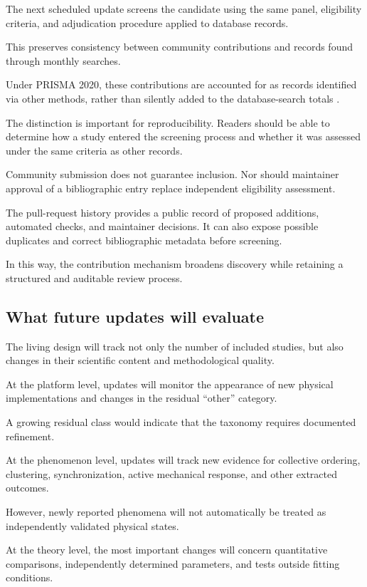 The next scheduled
update screens
the candidate using
the same panel,
eligibility criteria,
and adjudication
procedure applied
to database records.

This preserves
consistency between
community contributions
and records found
through monthly searches.

Under PRISMA 2020,
these contributions
are accounted for
as records identified
via other methods,
rather than silently
added to the
database-search totals
\cite{Page2021prisma}.

The distinction is
important for
reproducibility.
Readers should
be able to determine
how a study entered
the screening process
and whether it was
assessed under
the same criteria
as other records.

Community submission
does not guarantee
inclusion. Nor should
maintainer approval
of a bibliographic
entry replace
independent
eligibility assessment.

The pull-request
history provides
a public record
of proposed additions,
automated checks,
and maintainer
decisions. It can
also expose possible
duplicates and
correct bibliographic
metadata before
screening.

In this way,
the contribution
mechanism broadens
discovery while
retaining a
structured and
auditable review
process.

\subsection{What future updates will evaluate}
\label{sec:outlook-tracking}

The living design will track not only
the number of included studies,
but also changes in their scientific
content and methodological quality.

At the platform level,
updates will monitor the appearance
of new physical implementations
and changes in the residual
``other'' category.

A growing residual class
would indicate that
the taxonomy requires
documented refinement.

At the phenomenon level,
updates will track
new evidence for
collective ordering,
clustering, synchronization,
active mechanical response,
and other extracted outcomes.

However, newly reported
phenomena will not
automatically be treated
as independently validated
physical states.

At the theory level,
the most important
changes will concern
quantitative comparisons,
independently determined
parameters, and tests
outside fitting conditions.

